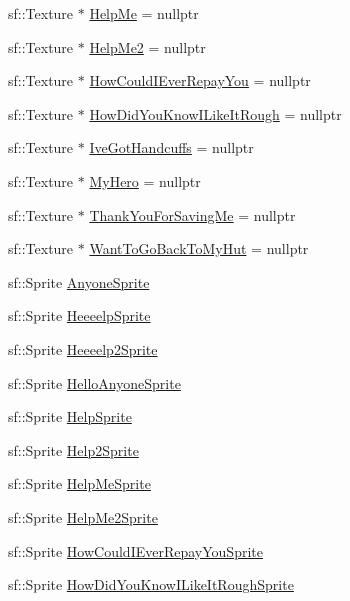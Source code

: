 \begin{DoxyCompactItemize}
sf\+::\+Texture $\ast$ \hyperlink{classDialogue_af92b13e8cc50209ba797311840053c18}{Help\+Me} = nullptr
\item 
sf\+::\+Texture $\ast$ \hyperlink{classDialogue_aaa2332a8606f52efefb6cbd7c5440e88}{Help\+Me2} = nullptr
\item 
sf\+::\+Texture $\ast$ \hyperlink{classDialogue_a81623c019b01367bebfb907cd9dc6bc9}{How\+Could\+I\+Ever\+Repay\+You} = nullptr
\item 
sf\+::\+Texture $\ast$ \hyperlink{classDialogue_a026bb6bfad700c2b1e2a6935b1dad15e}{How\+Did\+You\+Know\+I\+Like\+It\+Rough} = nullptr
\item 
sf\+::\+Texture $\ast$ \hyperlink{classDialogue_a1ada52a5cd172b6157ede69ec57468e8}{Ive\+Got\+Handcuffs} = nullptr
\item 
sf\+::\+Texture $\ast$ \hyperlink{classDialogue_ab568d70405f23e8c9d6f90fa21c902d6}{My\+Hero} = nullptr
\item 
sf\+::\+Texture $\ast$ \hyperlink{classDialogue_a7a406be3bda409b2fdb23cef3ccfcbe0}{Thank\+You\+For\+Saving\+Me} = nullptr
\item 
sf\+::\+Texture $\ast$ \hyperlink{classDialogue_a481bca285652d05f9ce0a26a45647ffc}{Want\+To\+Go\+Back\+To\+My\+Hut} = nullptr
\item 
sf\+::\+Sprite \hyperlink{classDialogue_a0c7cabd989d3b5afacfc0c277dd3967d}{Anyone\+Sprite}
\item 
sf\+::\+Sprite \hyperlink{classDialogue_aca454b4e5d23ecedd588615820a60179}{Heeeelp\+Sprite}
\item 
sf\+::\+Sprite \hyperlink{classDialogue_a0ab086e2f989569384267e69b3ecc7a1}{Heeeelp2\+Sprite}
\item 
sf\+::\+Sprite \hyperlink{classDialogue_ad8ea1a381a8dfbd9a20ea4987d119717}{Hello\+Anyone\+Sprite}
\item 
sf\+::\+Sprite \hyperlink{classDialogue_a6d1fb2d167d8efe017e3a5aac0ffcdc6}{Help\+Sprite}
\item 
sf\+::\+Sprite \hyperlink{classDialogue_aaab7a032364f62e4f39b0082fff4cd4d}{Help2\+Sprite}
\item 
sf\+::\+Sprite \hyperlink{classDialogue_a086dc209cfb24662dd190a6c5120d70c}{Help\+Me\+Sprite}
\item 
sf\+::\+Sprite \hyperlink{classDialogue_a252494e50a49bc206f1306d445deee80}{Help\+Me2\+Sprite}
\item 
sf\+::\+Sprite \hyperlink{classDialogue_a61430da086ec5f95b81faae24885b3f2}{How\+Could\+I\+Ever\+Repay\+You\+Sprite}
\item 
sf\+::\+Sprite \hyperlink{classDialogue_a55bf5f0f377f238bd6616f48d4999437}{How\+Did\+You\+Know\+I\+Like\+It\+Rough\+Sprite}

\end{DoxyCompactItemize}
